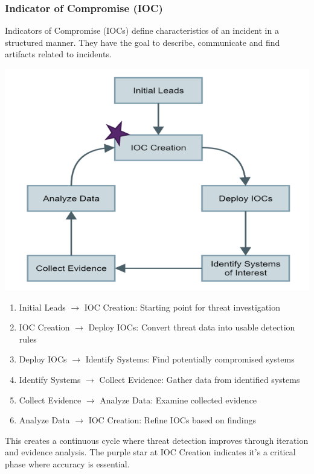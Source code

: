 \subsubsection*{Indicator of Compromise (IOC)}
Indicators of Compromise (IOCs) define characteristics of an incident in a structured manner. They have the goal to describe, communicate and find artifacts related to incidents.

\includegraphics[width=\textwidth]{resources/04-ioc.png}
\begin{enumerate}
  \item Initial Leads $\rightarrow$ IOC Creation: Starting point for threat investigation
  \item IOC Creation $\rightarrow$ Deploy IOCs: Convert threat data into usable detection rules
  \item Deploy IOCs $\rightarrow$ Identify Systems: Find potentially compromised systems
  \item Identify Systems $\rightarrow$ Collect Evidence: Gather data from identified systems
  \item Collect Evidence $\rightarrow$ Analyze Data: Examine collected evidence
  \item Analyze Data $\rightarrow$ IOC Creation: Refine IOCs based on findings
\end{enumerate}
This creates a continuous cycle where threat detection improves through iteration and evidence analysis.
The purple star at IOC Creation indicates it's a critical phase where accuracy is essential. \\


